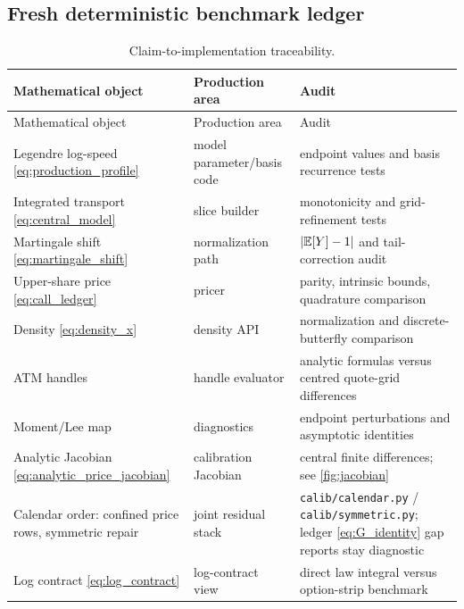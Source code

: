 \documentclass[11pt]{article}
\begin{document}
\subsection{Fresh deterministic benchmark ledger}

\begin{table}[H]
\centering
\caption{Diagnostics regenerated with the current production implementation.}
\label{tab:fresh_diagnostics}
\lqdfreshfitdiagtable
\end{table}

\begin{longtable}{@{}p{}p{}p{}@{}}
\caption{Claim-to-implementation traceability.}
\label{tab:traceability}\\
\toprule
Mathematical object & Production area & Audit\\
\midrule
\endfirsthead
\toprule
Mathematical object & Production area & Audit\\
\midrule
\endhead
Legendre log-speed \eqref{eq:production_profile}
& model parameter/basis code
& endpoint values and basis recurrence tests\\
Integrated transport \eqref{eq:central_model}
& slice builder
& monotonicity and grid-refinement tests\\
Martingale shift \eqref{eq:martingale_shift}
& normalization path
& $\lvert\mathbb{E}[Y]-1\rvert$ and tail-correction audit\\
Upper-share price \eqref{eq:call_ledger}
& pricer
& parity, intrinsic bounds, quadrature comparison\\
Density \eqref{eq:density_x}
& density API
& normalization and discrete-butterfly comparison\\
ATM handles
& handle evaluator
& analytic formulas versus centred quote-grid differences\\
Moment/Lee map
& diagnostics
& endpoint perturbations and asymptotic identities\\
Analytic Jacobian \eqref{eq:analytic_price_jacobian}
& calibration Jacobian
& central finite differences; see \cref{fig:jacobian}\\
Calendar order: confined price rows, symmetric repair
& joint residual stack
& \nolinkurl{calib/calendar.py} / \nolinkurl{calib/symmetric.py};
  ledger \eqref{eq:G_identity} gap reports stay diagnostic\\
Log contract \eqref{eq:log_contract}
& log-contract view
& direct law integral versus option-strip benchmark\\
\bottomrule
\end{longtable}
\end{document}
